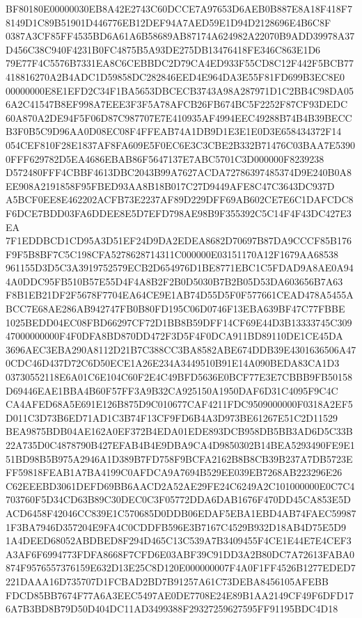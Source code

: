\documentclass[UTF8,fontset=fandol,zihao=-4,a4paper]{ctexart}
\begin{document}
{{BF80180E00000030EB8A42E2743C60DCCE7A97653D6AEB0B887E8A18F418F78149D1C89B51901D446776EB12DEF94A7AED59E1D94D2128696E4B6C8F
0387A3CF85FF4535BD6A61A6B58689AB87174A624982A22070B9ADD39978A37D456C38C940F4231B0FC4875B5A93DE275DB13476418FE346C863E1D6
79E77F4C5576B7331EA8C6CEBBDC2D79CA4ED933F55CD8C12F442F5BCB77418816270A2B4ADC1D59858DC282846EED4E964DA3E55F81FD699B3EC8E0
00000000E8E1EFD2C34F1BA5653DBCECB3743A98A287971D1C2BB4C98DA056A2C41547B8EF998A7EEE3F3F5A78AFCB26FB674BC5F2252F87CF93DEDC
60A870A2DE94F5F06D87C987707E7E410935AF4994EEC49288B74B4B39BECCB3F0B5C9D96AA0D08EC08F4FFEAB74A1DB9D1E3E1E0D3E658434372F14
054CEF810F28E1837AF8FA609E5F0EC6E3C3CBE2B332B71476C03BAA7E53900FFF629782D5EA4686EBAB86F5647137E7ABC5701C3D000000F8239238
D572480FFF4CBBF4613DBC2043B99A7627ACDA72786397485374D9E240B0A8EE908A2191858F95FBED93AA8B18B017C27D9449AFE8C47C3643DC937D
A5BCF0EE8E462202ACFB73E2237AF89D229DFF69AB602CE7E6C1DAFCDC8F6DCE7BDD03FA6DDEE8E5D7EFD798AE98B9F355392C5C14F4F43DC427E3EA
7F1EDDBCD1CD95A3D51EF24D9DA2EDEA8682D70697B87DA9CCCF85B176F9F5B8BF7C5C198CFA5278628714311C000000E03151170A12F1679AA68538
961155D3D5C3A3919752579ECB2D654976D1BE8771EBC1C5FDAD9A8AE0A944A0DDC95FB510B57E55D4F4A8B2F2B0D5030B7B2B05D53DA603656B7A63
F8B1EB21DF2F5678F7704EA64CE9E1AB74D55D5F0F577661CEAD478A5455ABCC7E68AE286AB942747FB0B80FD195C06D0746F13EBA639BF47C77FBBE
1025BEDD04EC08FBD66297CF72D1BB8B59DFF14CF69E44D3B13333745C30947000000000F4F0DFA8BD870DD472F3D5F4F0DCA911BD89110DE1CE45DA
3696AEC3EBA290A8112D21B7C388CC3BA8582ABE674DDB39E4301636506A470CDC46D437D72C6D50ECE1A26E234A3449510B91E14A090BEDA83CA1D3
03730552118E6A01C6E104C60F2E4C49BFD5636E0BCF77E3E7CBBB9FB50158D69446EAE1BBA4B60F57FF3A9B32CA925150A1950DAF6D31C4095F9C4C
CA4AFED68A5E691E126B875D9C010677CAF4211FDC9509000000F0318A2EF5D011C3D73B6ED71AD1C3B74F13CF9FD6B4A3D973BE61267E51C2D11529
BEA9875BDB04AE162A0EF372B4EDA01EDE893DCB958DB5BB3AD6D5C33B22A735D0C4878790B427EFAB4B4E9DBA9CA4D9850302B14BEA5293490FE9E1
51BD98B5B975A2946A1D389B7FD758F9BCFA2162B8B8CB39B237A7DB5723EFF59818FEAB1A7BA4199C0AFDCA9A7694B529EE039EB7268AB223296E26
C62EEEBD3061DEFD69BB6AACD2A52AE29FE24C6249A2C101000000E0C7C4703760F5D34CD63B89C30DEC0C3F05772DDA6DAB1676F470DD45CA853E5D
ACD6458F42046CC839E1C570685D0DDB06EDAF5EBA1EBD4AB74FAEC599871F3BA7946D357204E9FA4C0CDDFB596E3B7167C4529B932D18AB4D75E5D9
1A4DEED68052ABDBED8F294D465C13C539A7B3409455F4CE1E44E7E4CEF3A3AF6F6994773FDFA8668F7CFD6E03ABF39C91DD3A2B80DC7A72613FABA0
874F9576557376159E632D13E25C8D120E000000007F4A0F1FF4526B1277EDED7221DAAA16D735707D1FCBAD2BD7B91257A61C73DEBA8456105AFEBB
FDCD85BB7674F77A6A3EEC5497AE0DE7708E24E89B1AA2149CF49F6DFD176A7B3BD8B79D50D404DC11AD3499388F29327259627595FF91195BDC4D18
}}
\end{document}
